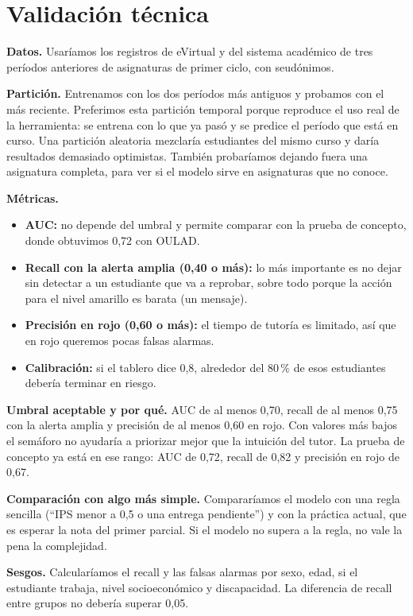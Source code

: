 \documentclass[11pt]{article}
\begin{document}
\section{Validación técnica}

\textbf{Datos.} Usaríamos los registros de eVirtual y del sistema académico de tres períodos anteriores de asignaturas de primer ciclo, con seudónimos.

\textbf{Partición.} Entrenamos con los dos períodos más antiguos y probamos con el más reciente. Preferimos esta partición temporal porque reproduce el uso real de la herramienta: se entrena con lo que ya pasó y se predice el período que está en curso. Una partición aleatoria mezclaría estudiantes del mismo curso y daría resultados demasiado optimistas. También probaríamos dejando fuera una asignatura completa, para ver si el modelo sirve en asignaturas que no conoce.

\textbf{Métricas.}
\begin{itemize}
\item \textbf{AUC:} no depende del umbral y permite comparar con la prueba de concepto, donde obtuvimos 0,72 con OULAD.
\item \textbf{Recall con la alerta amplia (0,40 o más):} lo más importante es no dejar sin detectar a un estudiante que va a reprobar, sobre todo porque la acción para el nivel amarillo es barata (un mensaje).
\item \textbf{Precisión en rojo (0,60 o más):} el tiempo de tutoría es limitado, así que en rojo queremos pocas falsas alarmas.
\item \textbf{Calibración:} si el tablero dice 0,8, alrededor del 80\,\% de esos estudiantes debería terminar en riesgo.
\end{itemize}

\textbf{Umbral aceptable y por qué.} AUC de al menos 0,70, recall de al menos 0,75 con la alerta amplia y precisión de al menos 0,60 en rojo. Con valores más bajos el semáforo no ayudaría a priorizar mejor que la intuición del tutor. La prueba de concepto ya está en ese rango: AUC de 0,72, recall de 0,82 y precisión en rojo de 0,67.

\textbf{Comparación con algo más simple.} Compararíamos el modelo con una regla sencilla (``IPS menor a 0,5 o una entrega pendiente'') y con la práctica actual, que es esperar la nota del primer parcial. Si el modelo no supera a la regla, no vale la pena la complejidad.

\textbf{Sesgos.} Calcularíamos el recall y las falsas alarmas por sexo, edad, si el estudiante trabaja, nivel socioeconómico y discapacidad. La diferencia de recall entre grupos no debería superar 0,05.
\end{document}
